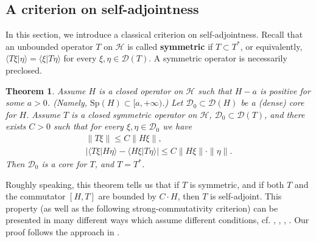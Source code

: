\documentclass[12pt,a4paper,notitlepage]{article}
\theoremstyle{definition}
\theoremstyle{plain}
\newtheorem{thm}[df]{Theorem}
\newcommand{\mc}{\mathcal}
\newcommand{\Dom}{\scr D}
\newcommand{\bk}[1]{\langle {#1}\rangle}
\newcommand{\scr}{\mathscr}
\newcommand{\Sp}{\mathrm{Sp}}
\numberwithin{equation}{subsection}
\begin{document}
\subsection{A criterion on self-adjointness}




In this section, we introduce a classical criterion on self-adjointness. Recall that an unbounded operator $T$ on $\mc H$ is called \textbf{symmetric} if $T\subset T^*$, or equivalently, $\bk{T\xi|\eta}=\bk{\xi|T\eta}$ for every $\xi,\eta\in\Dom(T)$. A symmetric operator is necessarily preclosed.

\begin{thm}\label{lb6}
Assume $H$ is a closed operator on $\mc H$ such that $H-a$ is positive for some $a>0$. (Namely, $\Sp(H)\subset [a,+\infty)$.) Let $\Dom_0\subset\Dom(H)$ be a (dense) core for $H$. Assume $T$ is a closed symmetric operator on $\mc H$, $\Dom_0\subset\Dom(T)$, and there exists $C>0$ such that for every $\xi,\eta\in\Dom_0$ we have
\begin{gather}
\lVert T\xi\lVert\leq C\lVert H\xi\lVert,\label{eq5}\\
\big|\bk{T\xi|H\eta}-\bk{H\xi|T\eta}\big|\leq C\lVert H\xi\lVert\cdot\lVert\eta\lVert.	\label{eq6}
\end{gather}
Then $\Dom_0$ is a core for $T$, and $T=T^*$.
\end{thm}


Roughly speaking, this theorem tells us that if $T$ is symmetric, and if  both $T$  and the commutator $[H,T]$ are bounded by $C\cdot H$, then $T$ is self-adjoint. This property (as well as the following strong-commutativity criterion) can be presented in many different ways which assume different conditions, cf. \cite[Prop. 2]{Nel72}, \cite{FL74}, \cite{DF77}, \cite[Thm. 19.4.3]{GJ}. Our proof follows the approach in \cite{FL74}. 
\end{document}
